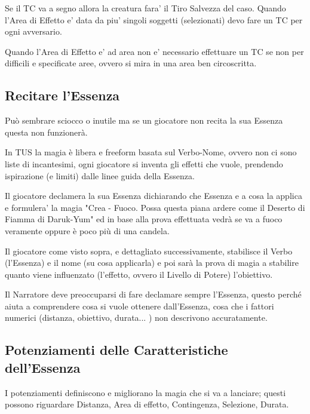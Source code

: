 \documentclass[a4paper,11pt,twoside,openany]{book}
\begin{document}
Se il TC va a segno allora la creatura fara' il Tiro Salvezza del caso.
Quando l'Area di Effetto e' data da piu' singoli soggetti (selezionati) devo fare un TC per ogni avversario.

Quando l'Area di Effetto e' ad area non e' necessario effettuare un TC se non per difficili e specificate aree, ovvero si mira in una area ben circoscritta.


\subsection{Recitare l'Essenza}

\label{recitare-lessenza}

Può sembrare sciocco o inutile ma se un giocatore non recita la sua Essenza questa non funzionerà.

In TUS la magia è libera e freeform basata sul Verbo-Nome, ovvero non ci sono liste di incantesimi, ogni giocatore si inventa gli effetti che vuole, prendendo ispirazione (e limiti) dalle linee guida della Essenza.

Il giocatore declamera la sua Essenza dichiarando che Essenza e a cosa la applica e formulera' la magia "Crea - Fuoco. Possa questa piana ardere come il Deserto di Fiamma di Daruk-Yum" ed in base alla prova effettuata vedrà se va a fuoco veramente oppure è poco più di una candela.

Il giocatore come visto sopra, e dettagliato successivamente, stabilisce il Verbo (l'Essenza) e il nome (su cosa applicarla) e poi sarà la prova di magia a stabilire quanto viene influenzato (l'effetto, ovvero il Livello di Potere) l'obiettivo.

Il Narratore deve preoccuparsi di fare declamare sempre l'Essenza, questo perché aiuta a comprendere cosa si vuole ottenere dall'Essenza, cosa che i fattori numerici (distanza, obiettivo, durata... ) non descrivono accuratamente.

\subsection{Potenziamenti delle Caratteristiche dell'Essenza}

\label{potenziamenti-delle-caratteristiche-dellessenza}

I potenziamenti definiscono e migliorano la magia che si va a lanciare; questi possono riguardare Distanza, Area di effetto, Contingenza, Selezione, Durata.
\end{document}
